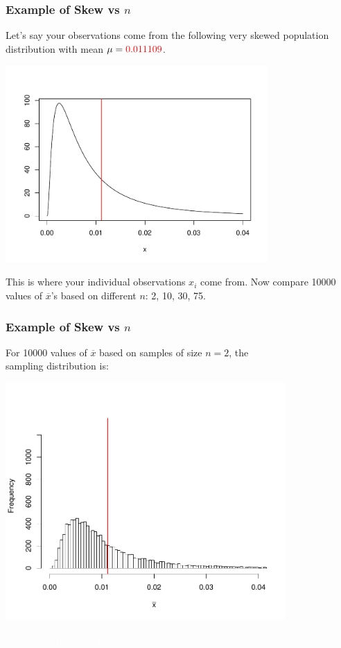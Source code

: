 \documentclass[slides]{beamer}
\newcommand{\blue}[1]{\textcolor{blue2}{#1}}
\newcommand{\white}[1]{\textcolor{white}{#1}}
\newcommand{\xbar}{\overline{x}}
\begin{document}
\begin{frame}
\frametitle{Example of Skew vs $n$}
Let's say your observations come from the following very skewed \blue{population distribution} with mean $\mu=\textcolor{red}{0.011109}$. 
\begin{center}
\pause\includegraphics[width=0.75\textwidth]{figure/true.pdf}
\end{center}
\pause  This is where your individual observations $x_i$ come from.  \pause Now compare 10000 values of $\xbar$'s based on different $n$:  2, 10, 30, 75.   
\end{frame}


\begin{frame}
\frametitle{Example of Skew vs $n$}
For 10000 values of $\xbar$ based on samples of size \blue{$n=2$}, the\\
sampling distribution is:
\pause\begin{center}
\includegraphics[width=0.8\textwidth]{figure/hist2.pdf}
\end{center}
\white{i.e. more normal and more narrow}
\end{frame}
\end{document}
